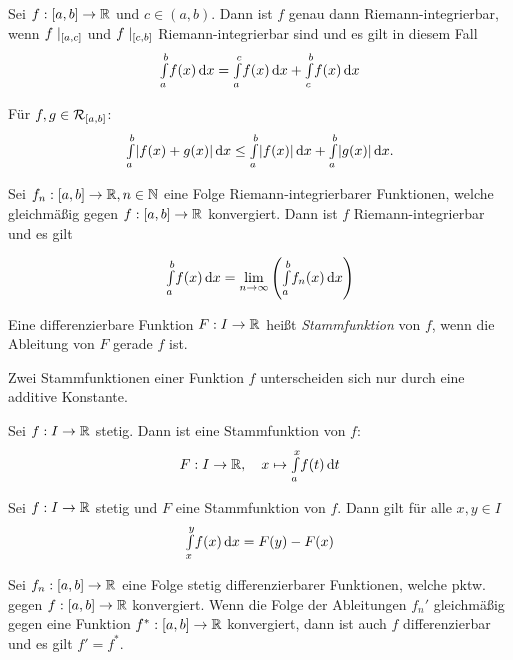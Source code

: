 \documentclass{cheat-sheet}
\begin{document}

\begin{satz}
  Sei $f : \left[ a, b \right] \to \mathbb{R}$ und $c \in (a, b)$. Dann ist $f$ genau dann Riemann-integrierbar, wenn $f\mid_{\left[ a, c \right]}$ und $f\mid_{\left[ c, b \right]}$ Riemann-integrierbar sind und es gilt in diesem Fall
  \[ {\textstyle \int\limits_{a}^{b}} f(x) \,\mathrm{d} x = {\textstyle \int\limits_{a}^{c}} f(x) \,\mathrm{d} x + {\textstyle \int\limits_{c}^{b}} f(x) \,\mathrm{d} x \]
\end{satz}


\begin{satz}
  Für $f, g \in \mathcal{R}_{\left[ a, b \right]}$:
  \[ {\textstyle \int\limits_{a}^{b}} \lvert f(x) + g(x)\rvert \,\mathrm{d} x \le {\textstyle \int\limits_{a}^{b}} \lvert f(x)\rvert \,\mathrm{d} x + {\textstyle \int\limits_{a}^{b}} \lvert g(x)\rvert \,\mathrm{d} x. \]
\end{satz}

\begin{satz}
  Sei $f_n : \left[ a, b \right] \to \mathbb{R}, n \in \mathbb{N}$ eine Folge Riemann-integrierbarer Funktionen, welche gleichmäßig gegen $f : \left[ a, b \right] \to \mathbb{R}$ konvergiert. Dann ist $f$ Riemann-integrierbar und es gilt

  \[ {\textstyle \int\limits_{a}^{b}} f(x) \,\mathrm{d} x = \lim_{n \to \infty} \left({\textstyle \int\limits_{a}^{b}} f_n(x) \,\mathrm{d} x \right) \]
\end{satz}

\begin{defn}
  Eine differenzierbare Funktion $F: I \to \mathbb{R}$ heißt \emph{Stammfunktion} von $f$, wenn die Ableitung von $F$ gerade $f$ ist.
\end{defn}

\begin{bem}
  Zwei Stammfunktionen einer Funktion $f$ unterscheiden sich nur durch eine additive Konstante.
\end{bem}

\begin{satz}
  Sei $f : I \to \mathbb{R}$ stetig. Dann ist eine Stammfunktion von $f$:
  \[ F : I \to \mathbb{R}, \quad x \mapsto {\textstyle \int\limits_{a}^{x}} f(t) \,\mathrm{d} t \]
\end{satz}

\begin{satz}
  Sei $f : I \to \mathbb{R}$ stetig und $F$ eine Stammfunktion von $f$. Dann gilt für alle $x, y \in I$
  \[ {\textstyle \int\limits_{x}^{y}} f(x) \,\mathrm{d} x = F(y) - F(x) \]
\end{satz}

\begin{satz}
  Sei $f_n : \left[ a, b \right] \to \mathbb{R}$ eine Folge stetig differenzierbarer Funktionen, welche pktw. gegen $f : \left[ a, b \right] \to \mathbb{R}$ konvergiert. Wenn die Folge der Ableitungen $f_n'$ gleichmäßig gegen eine Funktion $f^{*} : \left[ a, b \right] \to \mathbb{R}$ konvergiert, dann ist auch $f$ differenzierbar und es gilt $f' = f^{*}$.
\end{satz}
\end{document}

